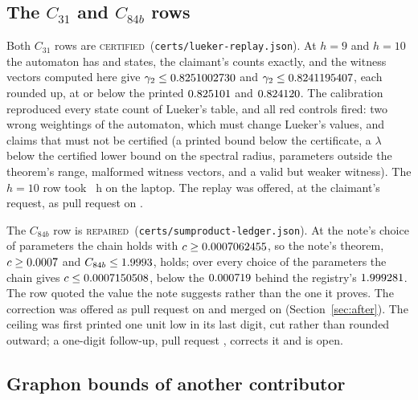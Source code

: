 \documentclass[preprint,11pt,authoryear,a4paper]{elsarticle}
\newcommand{\vword}[1]{{\normalfont\scshape #1}}
\newcommand{\vC}{\vword{certified}}
\newcommand{\vRep}{\vword{repaired}}
\begin{document}
\subsection{The $C_{31}$ and $C_{84b}$ rows}\label{sec:c31c84}

Both $C_{31}$ rows are \vC\ (\texttt{certs/lueker-replay.json}). At $h = 9$ and $h = 10$ the automaton has \OcLuStatesNine{} and \OcLuStatesTen{} states, the claimant's counts exactly, and the witness vectors computed here give $\gamma_2 \le 0.8251002730$ and $\gamma_2 \le 0.8241195407$, each rounded up, at or below the printed $0.825101$ and $0.824120$. The calibration reproduced every state count of Lueker's table, and all \OcLuReds{} red controls fired: two wrong weightings of the automaton, which must change Lueker's values, and claims that must not be certified (a printed bound below the certificate, a $\lambda$ below the certified lower bound on the spectral radius, parameters outside the theorem's range, malformed witness vectors, and a valid but weaker witness). The $h = 10$ row took \OcLuHoursTen~h on the laptop. The replay was offered, at the claimant's request, as pull request \OcLuOurPr{} on \OcLuFiled.

The $C_{84b}$ row is \vRep\ (\texttt{certs/sumproduct-ledger.json}). At the note's choice of parameters the chain holds with $c \ge 0.0007062455$, so the note's theorem, $c \ge 0.0007$ and $C_{84b} \le 1.9993$, holds; over every choice of the parameters the chain gives $c \le 0.0007150508$, below the $0.000719$ behind the registry's $1.999281$. The row quoted the value the note suggests rather than the one it proves. The correction was offered as pull request \OcSpPr{} on \OcSpFiled{} and merged on \OcSpMerged{} (Section~\ref{sec:after}). The ceiling was first printed one unit low in its last digit, cut rather than rounded outward; a one-digit follow-up, pull request \OcSpFollowPr, corrects it and is open.

\subsection{Graphon bounds of another contributor}\label{sec:graphons}
\end{document}
